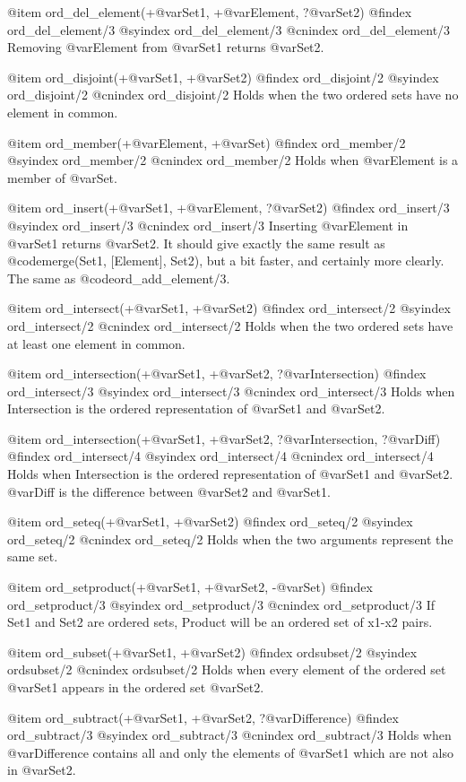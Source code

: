 {{{{{{{{@item ord_del_element(+@var{Set1}, +@var{Element}, ?@var{Set2})
@findex ord_del_element/3
@syindex ord_del_element/3
@cnindex ord_del_element/3
Removing @var{Element} from @var{Set1} returns @var{Set2}.

@item ord_disjoint(+@var{Set1}, +@var{Set2})
@findex ord_disjoint/2
@syindex ord_disjoint/2
@cnindex ord_disjoint/2
Holds when the two ordered sets have no element in common.

@item ord_member(+@var{Element}, +@var{Set})
@findex ord_member/2
@syindex ord_member/2
@cnindex ord_member/2
Holds when @var{Element} is a member of @var{Set}.

@item ord_insert(+@var{Set1}, +@var{Element}, ?@var{Set2})
@findex ord_insert/3
@syindex ord_insert/3
@cnindex ord_insert/3
Inserting @var{Element} in @var{Set1} returns @var{Set2}.  It should give
exactly the same result as @code{merge(Set1, [Element], Set2)}, but a
bit faster, and certainly more clearly. The same as @code{ord_add_element/3}.

@item ord_intersect(+@var{Set1}, +@var{Set2})
@findex ord_intersect/2
@syindex ord_intersect/2
@cnindex ord_intersect/2
Holds when the two ordered sets have at least one element in common.

@item ord_intersection(+@var{Set1}, +@var{Set2}, ?@var{Intersection})
@findex ord_intersect/3
@syindex ord_intersect/3
@cnindex ord_intersect/3
Holds when Intersection is the ordered representation of @var{Set1}
and @var{Set2}.

@item ord_intersection(+@var{Set1}, +@var{Set2}, ?@var{Intersection}, ?@var{Diff})
@findex ord_intersect/4
@syindex ord_intersect/4
@cnindex ord_intersect/4
Holds when Intersection is the ordered representation of @var{Set1}
and @var{Set2}. @var{Diff} is the difference between @var{Set2} and @var{Set1}.

@item ord_seteq(+@var{Set1}, +@var{Set2})
@findex ord_seteq/2
@syindex ord_seteq/2
@cnindex ord_seteq/2
Holds when the two arguments represent the same set.

@item ord_setproduct(+@var{Set1}, +@var{Set2}, -@var{Set})
@findex ord_setproduct/3
@syindex ord_setproduct/3
@cnindex ord_setproduct/3
If Set1 and Set2 are ordered sets, Product will be an ordered
set of x1-x2 pairs.

@item ord_subset(+@var{Set1}, +@var{Set2})
@findex ordsubset/2
@syindex ordsubset/2
@cnindex ordsubset/2
Holds when every element of the ordered set @var{Set1} appears in the
ordered set @var{Set2}.

@item ord_subtract(+@var{Set1}, +@var{Set2}, ?@var{Difference})
@findex ord_subtract/3
@syindex ord_subtract/3
@cnindex ord_subtract/3
Holds when @var{Difference} contains all and only the elements of @var{Set1}
which are not also in @var{Set2}.

}}}}}}}}
